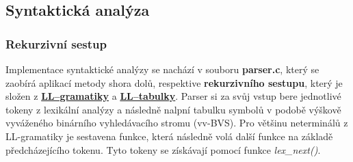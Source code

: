 \documentclass[a4paper, 12pt]{article} %
\begin{document}

        \subsection{Syntaktická analýza} \label{syntactics}
            \subsubsection{Rekurzivní sestup}
                Implementace syntaktické analýzy se nachází v souboru \textbf{parser.c}, který se
                zaobírá aplikací metody shora dolů, respektive \textbf{rekurzivního sestupu}, který
                je složen z \hyperref[llgramatika]{\textbf{LL--gramatiky}} a 
                \hyperref[lltabulka]{\textbf{LL--tabulky}}. Parser si za svůj vstup bere jednotlivé 
                tokeny z lexikální analýzy a následně nalpní tabulku symbolů v podobě výškově 
                vyváženého binárního vyhledávacího stromu (vv-BVS). Pro většinu neterminálů z 
                LL-gramatiky je sestavena funkce, která následně volá další funkce na základě 
                předcházejícího tokenu. Tyto tokeny se získávají pomocí funkce \textit{lex\_next()}.
\end{document}
